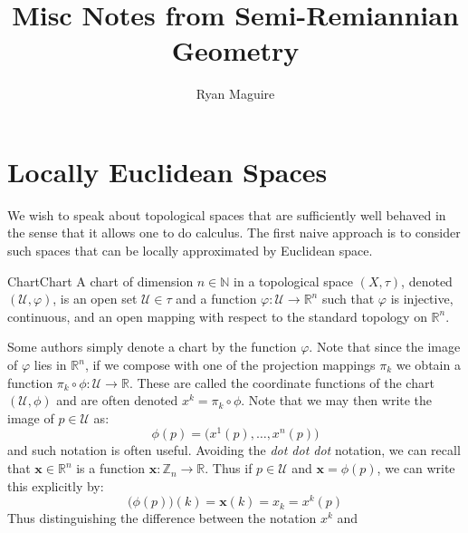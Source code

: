 \documentclass{article}                                                        %
\begin{document}
    \title{Misc Notes from Semi-Remiannian Geometry}
    \author{Ryan Maguire}
    \date{\vspace{-5ex}}
    \maketitle
    \tableofcontents
    \listoffigures
    \section{Locally Euclidean Spaces}
        We wish to speak about topological spaces that are sufficiently well
        behaved in the sense that it allows one to do calculus. The first
        naive approach is to consider such spaces that can be locally
        approximated by Euclidean space.
        \begin{fdefinition}{Chart}{Chart}
            A chart of dimension $n\in\mathbb{N}$ in a topological space
            $(X,\tau)$, denoted $(\mathcal{U},\varphi)$, is an open set
            $\mathcal{U}\in\tau$ and a function
            $\varphi:\mathcal{U}\rightarrow\mathbb{R}^{n}$ such that
            $\varphi$ is injective, continuous, and an open mapping with
            respect to the standard topology on $\mathbb{R}^{n}$.
        \end{fdefinition}
        Some authors simply denote a chart by the function $\varphi$. Note
        that since the image of $\varphi$ lies in $\mathbb{R}^{n}$, if we
        compose with one of the projection mappings $\pi_{k}$ we obtain a
        function $\pi_{k}\circ\phi:\mathcal{U}\rightarrow\mathbb{R}$. These
        are called the coordinate functions of the chart
        $(\mathcal{U},\phi)$ and are often denoted $x^{k}=\pi_{k}\circ\phi$.
        Note that we may then write the image of $p\in\mathcal{U}$ as:
        \begin{equation}
            \phi(p)=\big(x^{1}(p),\dots,x^{n}(p)\big)
        \end{equation}
        and such notation is often useful. Avoiding the \textit{dot dot dot}
        notation, we can recall that $\mathbf{x}\in\mathbb{R}^{n}$ is a
        function $\mathbf{x}:\mathbb{Z}_{n}\rightarrow\mathbb{R}$. Thus if
        $p\in\mathcal{U}$ and $\mathbf{x}=\phi(p)$, we can write this
        explicitly by:
        \begin{equation}
            \big(\phi(p)\big)(k)=\mathbf{x}(k)=x_{k}=x^{k}(p)
        \end{equation}
        Thus distinguishing the difference between the notation $x^{k}$ and
\end{document}
